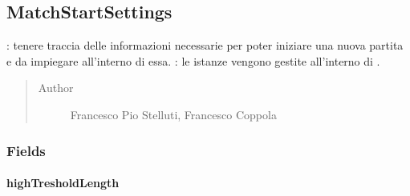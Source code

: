 \documentclass[letterpaper,10pt,italian,openany,oneside]{sphinxmanual}
\begin{document}
\subsection{MatchStartSettings}
\label{\detokenize{source/it/unicam/cs/pa/mastermind/gamecore/MatchStartSettings:matchstartsettings}}\label{\detokenize{source/it/unicam/cs/pa/mastermind/gamecore/MatchStartSettings::doc}}

\begin{fulllineitems}
\label{\detokenize{source/it/unicam/cs/pa/mastermind/gamecore/MatchStartSettings:it.unicam.cs.pa.mastermind.gamecore.MatchStartSettings}}
: tenere traccia delle informazioni necessarie per poter iniziare una nuova partita e da impiegare all’interno di essa. : le istanze vengono gestite all’interno di .
\begin{quote}\begin{description}
\item[{Author}] \leavevmode
Francesco Pio Stelluti, Francesco Coppola

\end{description}\end{quote}

\end{fulllineitems}



\subsubsection{Fields}
\label{\detokenize{source/it/unicam/cs/pa/mastermind/gamecore/MatchStartSettings:fields}}

\paragraph{highTresholdLength}
\label{\detokenize{source/it/unicam/cs/pa/mastermind/gamecore/MatchStartSettings:hightresholdlength}}

\begin{fulllineitems}
\label{\detokenize{source/it/unicam/cs/pa/mastermind/gamecore/MatchStartSettings:it.unicam.cs.pa.mastermind.gamecore.MatchStartSettings.highTresholdLength}}
\end{fulllineitems}
\end{document}
